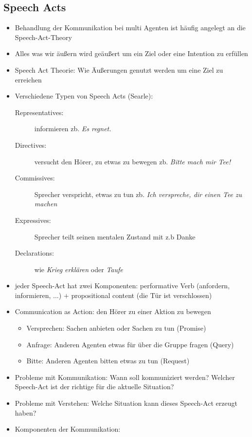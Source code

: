 \documentclass{article} %
\begin{document}
	\subsection{Speech Acts}
	\begin{itemize}
		\item Behandlung der Kommunikation bei multi Agenten ist häufig angelegt an die Speech-Act-Theory
		\item Alles was wir äußern wird geäußert um ein Ziel oder eine Intention zu erfüllen
		\item Speech Act Theorie: Wie Äußerungen genutzt werden um eine Ziel zu erreichen
		\item Verschiedene Typen von Speech Acts (Searle):
		\begin{description}
			\item [Representatives:] informieren zb. \emph{Es regnet.}
			\item [Directives:] versucht den Hörer, zu etwas zu bewegen zb. \emph{Bitte mach mir Tee!}
			\item [Commissives:] Sprecher verspricht, etwas zu tun zb. \emph{Ich verspreche, dir einen Tee zu machen}
			\item [Expressives:] Sprecher teilt seinen mentalen Zustand mit z.b Danke
			\item [Declarations:] wie \emph{Krieg erklären} oder \emph{Taufe}
		\end{description}
		\item jeder Speech-Act hat zwei Komponenten: performative Verb (anfordern, informieren, ...) $+$ propositional content (die Tür ist verschlossen)
		\item Communication as Action: den Hörer zu einer Aktion zu bewegen
		\begin{itemize}
			\item Versprechen: Sachen anbieten oder Sachen zu tun (Promise)
			\item Anfrage: Anderen Agenten etwas für über die Gruppe fragen (Query)
			\item Bitte: Anderen Agenten bitten etwas zu tun (Request)
		\end{itemize}
		\item Probleme mit Kommunikation: Wann soll kommuniziert werden? Welcher Speech-Act ist der richtige für die aktuelle Situation? 
		\item Probleme mit Verstehen: Welche Situation kann dieses Speech-Act erzeugt haben?
		\item Komponenten der Kommunikation:
		\begin{itemize}

\end{itemize}
\end{itemize}
\end{document}
